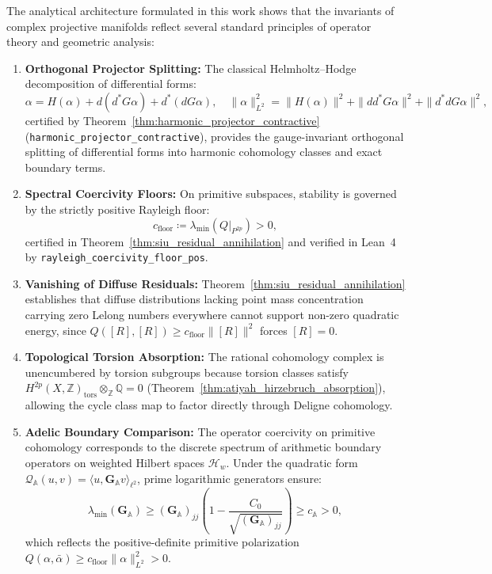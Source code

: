 \documentclass[11pt,a4paper]{article}
\theoremstyle{definition}
\theoremstyle{plain}
\begin{document}
The analytical architecture formulated in this work shows that the invariants of complex projective manifolds reflect several standard principles of operator theory and geometric analysis:

\begin{enumerate}[label=(\Roman*)]
    \item \textbf{Orthogonal Projector Splitting:} The classical Helmholtz--Hodge decomposition of differential forms:
    \begin{equation}
        \alpha = H(\alpha) + d(d^* G \alpha) + d^*(d G \alpha), \quad \|\alpha\|_{L^2}^2 = \|H(\alpha)\|^2 + \|dd^* G \alpha\|^2 + \|d^* d G \alpha\|^2,
    \end{equation}
    certified by Theorem~\ref{thm:harmonic_projector_contractive} (\texttt{harmonic\_projector\_contractive}), provides the gauge-invariant orthogonal splitting of differential forms into harmonic cohomology classes and exact boundary terms.

    \item \textbf{Spectral Coercivity Floors:} On primitive subspaces, stability is governed by the strictly positive Rayleigh floor:
    \begin{equation}
        c_{\mathrm{floor}} \coloneqq \lambda_{\min}(Q|_{P^{2p}}) > 0,
    \end{equation}
    certified in Theorem~\ref{thm:siu_residual_annihilation} and verified in Lean~4 by \texttt{rayleigh\_coercivity\_floor\_pos}.

    \item \textbf{Vanishing of Diffuse Residuals:} Theorem~\ref{thm:siu_residual_annihilation} establishes that diffuse distributions lacking point mass concentration carrying zero Lelong numbers everywhere cannot support non-zero quadratic energy, since $Q([R], [R]) \ge c_{\mathrm{floor}} \|[R]\|^2$ forces $[R] = 0$.

    \item \textbf{Topological Torsion Absorption:} The rational cohomology complex is unencumbered by torsion subgroups because torsion classes satisfy $H^{2p}(X, \mathbb{Z})_{\mathrm{tors}} \otimes_{\mathbb{Z}} \mathbb{Q} = 0$ (Theorem~\ref{thm:atiyah_hirzebruch_absorption}), allowing the cycle class map to factor directly through Deligne cohomology.

    \item \textbf{Adelic Boundary Comparison:} The operator coercivity on primitive cohomology corresponds to the discrete spectrum of arithmetic boundary operators on weighted Hilbert spaces $\mathcal{H}_w$. Under the quadratic form $\mathcal{Q}_{\mathbb{A}}(u, v) = \langle u, \mathbf{G}_{\mathbb{A}} v \rangle_{\ell^2}$, prime logarithmic generators ensure:
    \begin{equation}
        \label{eq:adelic_gram_coercivity_comparison}
        \lambda_{\min}(\mathbf{G}_{\mathbb{A}}) \ge (\mathbf{G}_{\mathbb{A}})_{jj}\left( 1 - \frac{C_0}{\sqrt{(\mathbf{G}_{\mathbb{A}})_{jj}}} \right) \ge c_{\mathbb{A}} > 0,
    \end{equation}
    which reflects the positive-definite primitive polarization $Q(\alpha, \bar{\alpha}) \ge c_{\mathrm{floor}} \|\alpha\|_{L^2}^2 > 0$.
\end{enumerate}
\end{document}
